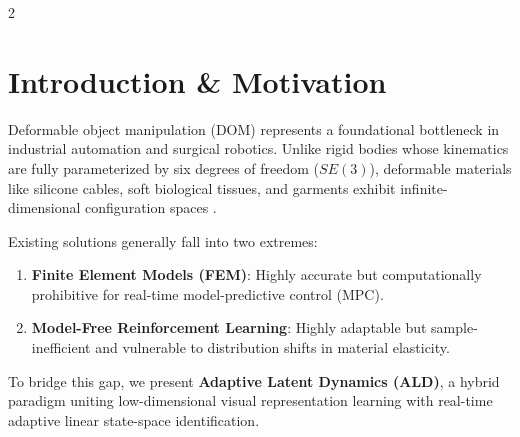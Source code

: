 \documentclass[10pt, a4paper]{scrartcl}
\begin{document}
\begin{multicols}{2}

\section{Introduction \& Motivation}
Deformable object manipulation (DOM) represents a foundational bottleneck in industrial automation and surgical robotics. Unlike rigid bodies whose kinematics are fully parameterized by six degrees of freedom ($SE(3)$), deformable materials like silicone cables, soft biological tissues, and garments exhibit infinite-dimensional configuration spaces \cite{sterling2024}. 

Existing solutions generally fall into two extremes:
\begin{enumerate}[leftmargin=14pt, itemsep=1pt, topsep=2pt]
  \item \textbf{Finite Element Models (FEM)}: Highly accurate but computationally prohibitive for real-time model-predictive control (MPC).
  \item \textbf{Model-Free Reinforcement Learning}: Highly adaptable but sample-inefficient and vulnerable to distribution shifts in material elasticity.
\end{enumerate}

To bridge this gap, we present \textbf{Adaptive Latent Dynamics (ALD)}, a hybrid paradigm uniting low-dimensional visual representation learning with real-time adaptive linear state-space identification.

\begin{center}
  \begin{tcolorbox}[
    colback=lightbg,
    colframe=boxborder,
    arc=2mm,
    boxrule=0.6pt,
    left=4pt, right=4pt, top=6pt, bottom=4pt
  ]
    \centering
\end{tcolorbox}
\end{center}
\end{multicols}
\end{document}
